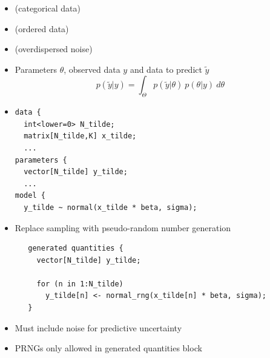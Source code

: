 \documentclass[10pt]{report}
\begin{document}
\begin{itemize}
\item {} (categorical data)
\item {} (ordered data)
\item {} (overdispersed noise)
\end{itemize}

\begin{itemize}
\item Parameters $\theta$, observed data $y$ and data to predict $\tilde{y}$
\[
p(\tilde{y}|y) = \int_{\Theta} p(\tilde{y}|\theta) \ p(\theta|y) \ d\theta
\]
\item 
{\small
\begin{Verbatim}
data {
  int<lower=0> N_tilde;
  matrix[N_tilde,K] x_tilde;
  ...
parameters {
  vector[N_tilde] y_tilde;
  ...
model {
  y_tilde ~ normal(x_tilde * beta, sigma);
\end{Verbatim}
}
\end{itemize}

\begin{itemize}
\item Replace sampling with pseudo-random number generation
{\footnotesize
\begin{Verbatim}
   generated quantities {
     vector[N_tilde] y_tilde;

     for (n in 1:N_tilde) 
       y_tilde[n] <- normal_rng(x_tilde[n] * beta, sigma);
   }
\end{Verbatim}
}
\item Must include noise for predictive uncertainty
\item PRNGs only allowed in generated quantities block
\end{itemize}
\end{document}
